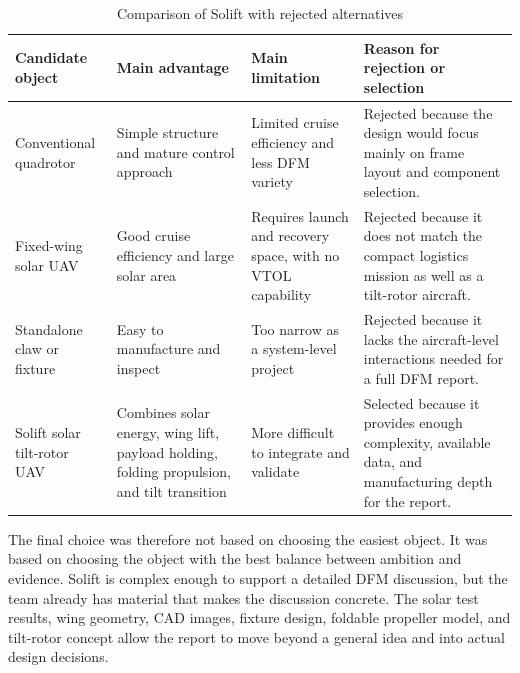 \begin{table}[htbp]
    \centering
    \caption{Comparison of Solift with rejected alternatives}
    \label{tab:alternative-comparison}
    \begin{tabular}{p{} p{} p{} p{}}
        \toprule
        Candidate object & Main advantage & Main limitation & Reason for rejection or selection \\
        \midrule
        Conventional quadrotor &
        Simple structure and mature control approach &
        Limited cruise efficiency and less DFM variety &
        Rejected because the design would focus mainly on frame layout and component selection. \\
        Fixed-wing solar UAV &
        Good cruise efficiency and large solar area &
        Requires launch and recovery space, with no VTOL capability &
        Rejected because it does not match the compact logistics mission as well as a tilt-rotor aircraft. \\
        Standalone claw or fixture &
        Easy to manufacture and inspect &
        Too narrow as a system-level project &
        Rejected because it lacks the aircraft-level interactions needed for a full DFM report. \\
        Solift solar tilt-rotor UAV &
        Combines solar energy, wing lift, payload holding, folding propulsion, and tilt transition &
        More difficult to integrate and validate &
        Selected because it provides enough complexity, available data, and manufacturing depth for the report. \\
        \bottomrule
    \end{tabular}
\end{table}

The final choice was therefore not based on choosing the easiest object. It was based on choosing the object with the best balance between ambition and evidence. Solift is complex enough to support a detailed DFM discussion, but the team already has material that makes the discussion concrete. The solar test results, wing geometry, CAD images, fixture design, foldable propeller model, and tilt-rotor concept allow the report to move beyond a general idea and into actual design decisions.
